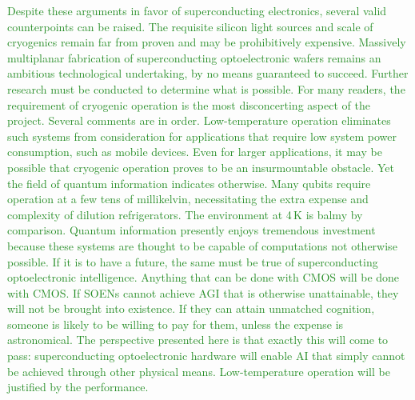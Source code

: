 \documentclass[twocolumn]{article}
\begin{document}
{\textcolor{ForestGreen}{Despite these arguments in favor of superconducting electronics, several valid counterpoints can be raised. The requisite silicon light sources and scale of cryogenics remain far from proven and may be prohibitively expensive. Massively multiplanar fabrication of superconducting optoelectronic wafers remains an ambitious technological undertaking, by no means guaranteed to succeed. Further research must be conducted to determine what is possible. For many readers, the requirement of cryogenic operation is the most disconcerting aspect of the project. Several comments are in order. Low-temperature operation eliminates such systems from consideration for applications that require low system power consumption, such as mobile devices. Even for larger applications, it may be possible that cryogenic operation proves to be an insurmountable obstacle. Yet the field of quantum information indicates otherwise. Many qubits require operation at a few tens of millikelvin, necessitating the extra expense and complexity of dilution refrigerators. The environment at 4\,K is balmy by comparison. Quantum information presently enjoys tremendous investment because these systems are thought to be capable of computations not otherwise possible. If it is to have a future, the same must be true of superconducting optoelectronic intelligence. Anything that can be done with CMOS will be done with CMOS. If SOENs cannot achieve AGI that is otherwise unattainable, they will not be brought into existence. If they can attain unmatched cognition, someone is likely to be willing to pay for them, unless the expense is astronomical. The perspective presented here is that exactly this will come to pass: superconducting optoelectronic hardware will enable AI that simply cannot be achieved through other physical means. Low-temperature operation will be justified by the performance.}

}
\end{document}
